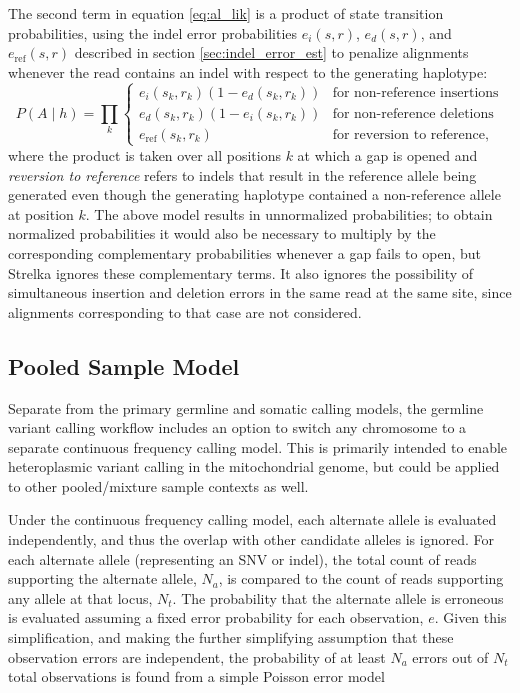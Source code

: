\documentclass{article}
\begin{document}
The second term in equation \ref{eq:al_lik} is a product of state transition probabilities, using the indel error probabilities $e_i(s,r)$, $e_d(s,r)$, and $e_{\text{ref}}(s,r)$ described in section \ref{sec:indel_error_est} to penalize alignments whenever the read contains an indel with respect to the generating haplotype:
\begin{equation*}
\label{eq:transition_probs}
P(A \mid h) = \prod_k \left\{
\begin{array}{ll}
e_i(s_k,r_k)(1-e_d(s_k,r_k)) & \textrm{for~non-reference~insertions}\\
e_d(s_k,r_k)(1-e_i(s_k,r_k)) & \textrm{for~non-reference~deletions}\\
e_{\text{ref}}(s_k,r_k) & \textrm{for~reversion~to~reference},
\end{array}
\right.
\end{equation*}
where the product is taken over all positions $k$ at which a gap is opened and \emph{reversion to reference} refers to indels that result in the reference allele being generated even though the generating haplotype contained a non-reference allele at position $k$. The above model results in unnormalized probabilities; to obtain normalized probabilities it would also be necessary to multiply by the corresponding complementary probabilities whenever a gap fails to open, but Strelka ignores these complementary terms. It also ignores the possibility of simultaneous insertion and deletion errors in the same read at the same site, since alignments corresponding to that case are not considered.

\subsection{Pooled Sample Model}

Separate from the primary germline and somatic calling models, the germline variant calling workflow includes an option to switch any chromosome to a separate continuous frequency calling model. This is primarily intended to enable heteroplasmic variant calling in the mitochondrial genome, but could be applied to other pooled/mixture sample contexts as well.

Under the continuous frequency calling model, each alternate allele is evaluated independently, and thus the overlap with other candidate alleles is ignored. For each alternate allele (representing an SNV or indel), the total count of reads supporting the alternate allele, $N_a$, is compared to the count of reads supporting any allele at that locus, $N_t$. The probability that the alternate allele is erroneous is evaluated assuming a fixed error probability for each observation, $e$. Given this simplification, and making the further simplifying assumption that these observation errors are independent, the probability of at least $N_a$ errors out of $N_t$ total observations is found from a simple Poisson error model
\end{document}
